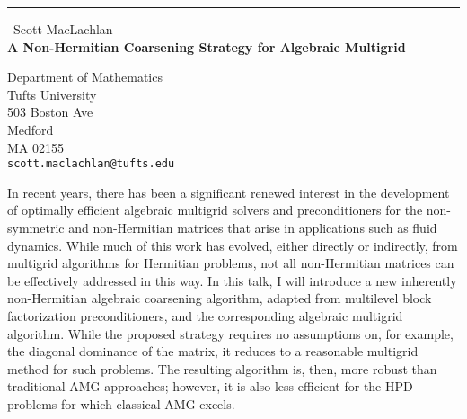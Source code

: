\documentclass{report}
\begin{document}
\begin{center}
\rule{6in}{1pt} \
{\large Scott MacLachlan \\
{\bf A Non-Hermitian Coarsening Strategy for Algebraic Multigrid}}

Department of Mathematics \\ Tufts University \\ 503 Boston Ave \\ Medford \\ MA 02155
\\
{\tt scott.maclachlan@tufts.edu}\end{center}

In recent years, there has been a significant renewed interest in the
development of optimally efficient algebraic multigrid solvers and
preconditioners for the non-symmetric and non-Hermitian matrices that
arise in applications such as fluid dynamics. While much of this work
has evolved, either directly or indirectly, from multigrid algorithms
for Hermitian problems, not all non-Hermitian matrices can be
effectively addressed in this way. In this talk, I will introduce a
new inherently non-Hermitian algebraic coarsening algorithm, adapted
from multilevel block factorization preconditioners, and the
corresponding algebraic multigrid algorithm. While the proposed
strategy requires no assumptions on, for example, the diagonal
dominance of the matrix, it reduces to a reasonable multigrid method
for such problems. The resulting algorithm is, then, more robust
than traditional AMG approaches; however, it is also less efficient
for the HPD problems for which classical AMG excels.
\end{document}
